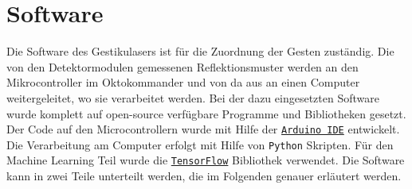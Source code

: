 
\section{Software}
\label{sec:Software}

Die Software des Gestikulasers ist für die Zuordnung der Gesten zuständig. Die von den Detektormodulen gemessenen Reflektionsmuster werden an den Mikrocontroller im Oktokommander und von da aus an einen Computer weitergeleitet, wo sie verarbeitet werden. Bei der dazu eingesetzten Software wurde komplett auf open-source verfügbare Programme und Bibliotheken gesetzt. Der Code auf den Microcontrollern wurde mit Hilfe der \href{https://www.arduino.cc/en/Main/Software}{\texttt{Arduino IDE}} entwickelt. Die Verarbeitung am Computer erfolgt mit Hilfe von \texttt{Python} Skripten. Für den Machine Learning Teil wurde die \href{https://www.tensorflow.org/}{\texttt{TensorFlow}\texttrademark} Bibliothek verwendet. Die Software kann in zwei Teile unterteilt werden, die im Folgenden genauer erläutert werden.

